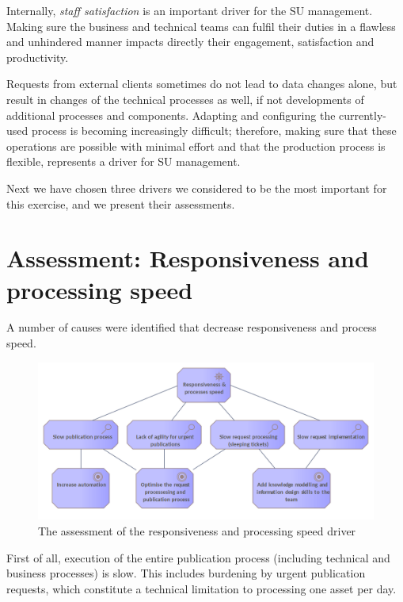 	Internally, \textit{staff satisfaction} is an important driver for the SU management. Making sure the business and technical teams can fulfil their duties in a flawless and unhindered manner impacts directly their engagement, satisfaction and productivity.
	
	Requests from external clients sometimes do not lead to data changes alone, but result in changes of the technical processes as well, if not developments of additional processes and components. Adapting and configuring the currently-used process is becoming increasingly difficult; therefore, making sure that these operations are possible with minimal effort and that the production process is flexible, represents a driver for SU management. 
	
	Next we have chosen three drivers we considered to be the most important for this exercise, and we present their assessments. 
	
	\section{Assessment: Responsiveness and processing speed}
	
	A number of causes were identified that decrease responsiveness and process speed. 
	
	\begin{figure}[!h]
		\centering
		\includegraphics[width=\textwidth]{images/motivation/Responsiveless & Process Speed.png}
		\caption{The assessment of the responsiveness and processing speed driver}
		\label{fig:responsiveness-and-processing-speed}
	\end{figure}
	
	First of all, execution of the entire publication process (including technical and business processes) is slow. This includes burdening by urgent publication requests, which constitute a technical limitation to processing one asset per day. 
	
